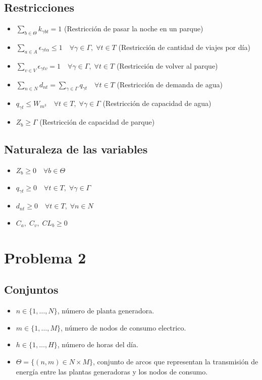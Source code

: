 \documentclass[addpoints,10pt]{exam}
\begin{document}
\begin{flushleft}
		\subsection{Restricciones}
		\begin{itemize}
			\item $ \sum\limits_{b \in \Theta} k_{\gamma b t} = 1 $ (Restricción de pasar la noche en un parque)
			\item $\sum\limits_{a \in A} \epsilon_{\gamma t\alpha} \leq 1 \quad \forall \gamma \in \Gamma, \; \forall t \in T$ (Restricción de cantidad de viajes por día)
			\item $\sum\limits_{v \in V} \epsilon_{\gamma t v} = 1 \quad \forall \gamma \in \Gamma, \; \forall t \in T$ (Restricción de volver al parque)
			\item $\sum\limits_{n \in N} d_{nt} = \sum\limits_{\gamma \in \Gamma} q_{\gamma t} \quad \forall t \in T$ (Restricción de demanda de agua)
			\item $q_{\gamma t} \leq W_{m^3} \quad \forall t \in T, \; \forall \gamma \in \Gamma$ (Restricción de capacidad de agua)
			\item $Z_{b} \geq \Gamma$ (Restricción de capacidad de parque)
		\end{itemize}

		\subsection{Naturaleza de las variables}
		\begin{itemize}
			\item $Z_{b} \geq 0 \quad \forall b \in \Theta$
			\item $q_{\gamma t} \geq 0 \quad \forall t \in T, \; \forall \gamma \in \Gamma$
			\item $d_{nt} \geq 0 \quad \forall t \in T, \; \forall n \in N$
			\item $C_{a}, \; C_{v}, \; CL_{b} \geq 0$
		\end{itemize}
		
		\section{Problema 2}
			

		\subsection{Conjuntos}
		\begin{itemize}
			\item $n \in \{1, \ldots, N\}$, número de planta generadora.
			\item $m \in \{1, \ldots, M\}$, número de nodos de consumo electrico.
			\item $h \in \{1, \ldots, H\}$, número de horas del día.
			\item $\Theta = \{(n,m) \in N \times M\}$, conjunto de arcos que representan la transmisión de energía entre las plantas generadoras y los nodos de consumo.
		\end{itemize}
		

\end{flushleft}
\end{document}

